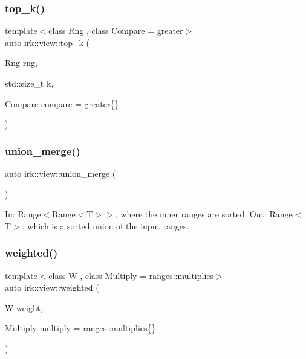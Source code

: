 \subsubsection{\texorpdfstring{top\+\_\+k()}{top\_k()}\hspace{0.1cm}{\footnotesize\ttfamily [2/2]}}
{\footnotesize\ttfamily template$<$class Rng , class Compare  = greater$>$ \\
auto irk\+::view\+::top\+\_\+k (\begin{DoxyParamCaption}\item[{Rng}]{rng,  }\item[{std\+::size\+\_\+t}]{k,  }\item[{Compare}]{compare = {\ttfamily \mbox{\hyperlink{structirk_1_1view_1_1greater}{greater}}\{\}} }\end{DoxyParamCaption})}

\mbox{\label{namespaceirk_1_1view_acc3a1f866f74d50daa7ed8e6bac9ddbb}} 
\subsubsection{\texorpdfstring{union\+\_\+merge()}{union\_merge()}}
{\footnotesize\ttfamily auto irk\+::view\+::union\+\_\+merge (\begin{DoxyParamCaption}{ }\end{DoxyParamCaption})}

In\+: Range$<$Range$<$\+T$>$$>$, where the inner ranges are sorted. Out\+: Range$<$\+T$>$, which is a sorted union of the input ranges. \mbox{\label{namespaceirk_1_1view_ac30f787832859d974a3db71afa5c953f}} 
\subsubsection{\texorpdfstring{weighted()}{weighted()}}
{\footnotesize\ttfamily template$<$class W , class Multiply  = ranges\+::multiplies$>$ \\
auto irk\+::view\+::weighted (\begin{DoxyParamCaption}\item[{W}]{weight,  }\item[{Multiply}]{multiply = {\ttfamily ranges\+:\+:multiplies\{\}} }\end{DoxyParamCaption})}

